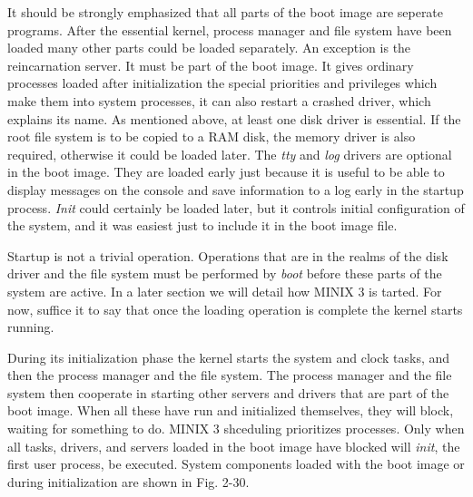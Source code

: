 \documentclass{book}
\newcommand {\sys} [1] {\textsl{#1}}
\begin{document}
It should be strongly emphasized that all parts of the boot image are seperate programs.
After the essential kernel, process manager and file system have been loaded many other parts could be loaded separately.
An exception is the reincarnation server.
It must be part of the boot image.
It gives ordinary processes loaded after initialization the special priorities and privileges 
which make them into system processes, it can also restart a crashed driver, which explains its name.
As mentioned above, at least one disk driver is essential.
If the root file system is to be copied to a RAM disk, the memory driver is also required, otherwise it could be loaded later.
The \sys{tty} and \sys{log} drivers are optional in the boot image.
They are loaded early just because it is useful to be able to display messages on the console 
and save information to a log early in the startup process.
\sys{Init} could certainly be loaded later, but it controls initial configuration of the system, 
and it was easiest just to include it in the boot image file.

Startup is not a trivial operation.
Operations that are in the realms of the disk driver and the file system must be performed by \sys{boot} before these parts of the system are active.
In a later section we will detail how MINIX 3 is tarted.
For now, suffice it to say that once the loading operation is complete the kernel starts running.

During its initialization phase the kernel starts the system and clock tasks,
and then the process manager and the file system.
The process manager and the file system then cooperate in starting other servers and drivers that are part of the boot image.
When all these have run and initialized themselves, they will block, waiting for something to do.
MINIX 3 shceduling prioritizes processes.
Only when all tasks, drivers, and servers loaded in the boot image have blocked will \sys{init}, the first user process, be executed.
System components loaded with the boot image or during initialization are shown in Fig. 2-30.
\end{document}
